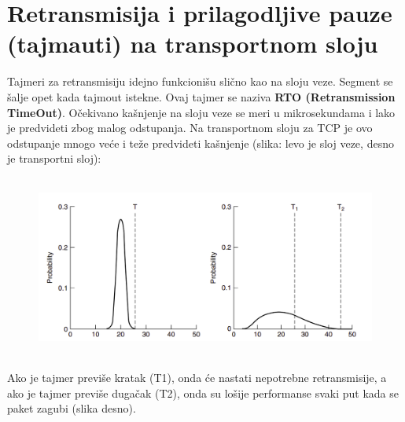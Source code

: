 \documentclass[a4paper]{article}
\begin{document}
\section{Retransmisija i prilagodljive pauze (tajmauti) na transportnom sloju}
    Tajmeri za retransmisiju idejno funkcionišu slično kao na sloju veze. Segment se šalje opet
    kada tajmout istekne. Ovaj tajmer se naziva \textbf{RTO (Retransmission TimeOut)}. Očekivano
    kašnjenje na sloju veze se meri u mikrosekundama i lako je predvideti zbog malog odstupanja. Na
    transportnom sloju za TCP je ovo odstupanje mnogo veće i teže predvideti kašnjenje
    (slika: levo je sloj veze, desno je transportni sloj):
    \begin{figure}[H]
        \begin{center}
            \includegraphics[width=120mm,height=60mm]{Slike/tcp_retransmisija.png}
        \end{center}
    \end{figure}
    Ako je tajmer previše kratak (T1), onda će nastati nepotrebne retransmisije, a ako je
    tajmer previše dugačak (T2), onda su lošije performanse svaki put kada se paket zagubi
    (slika desno).
\end{document}
